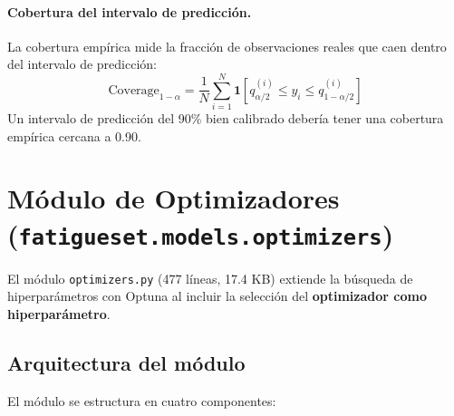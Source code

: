 \documentclass[12pt, a4paper]{article}
\newcommand{\code}[1]{\texttt{#1}}
\begin{document}
\paragraph{Cobertura del intervalo de predicción.}
La cobertura empírica mide la fracción de observaciones reales que caen dentro del intervalo de predicción:
\[
\text{Coverage}_{1-\alpha} = \frac{1}{N} \sum_{i=1}^{N} \mathbf{1}\left[ q_{\alpha/2}^{(i)} \leq y_i \leq q_{1-\alpha/2}^{(i)} \right]
\]
Un intervalo de predicción del 90\% bien calibrado debería tener una cobertura empírica cercana a 0.90.


\section{Módulo de Optimizadores (\code{fatigueset.models.optimizers})}
\label{sec:optimizers}

El módulo \code{optimizers.py} (477 líneas, 17.4 KB) extiende la búsqueda de hiperparámetros con Optuna al incluir la selección del \textbf{optimizador como hiperparámetro}.

\subsection{Arquitectura del módulo}

El módulo se estructura en cuatro componentes:
\end{document}
